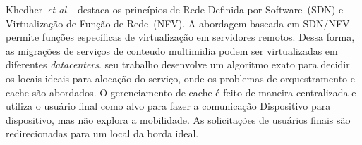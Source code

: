 Khedher~\textit{et al.}~\cite{khedherComNet2017, khedherLCN2017} destaca os princípios de Rede Definida por Software~(SDN) e Virtualização de Função de Rede~(NFV). A abordagem baseada em SDN/NFV permite funções específicas de virtualização em servidores remotos. Dessa forma, as migrações de serviços de conteudo multimidia podem ser virtualizadas em diferentes \textit{datacenters}. seu trabalho desenvolve um algoritmo exato para decidir os locais ideais para alocação do serviço, onde os problemas de orquestramento e cache são abordados. 
O gerenciamento de cache é feito de maneira centralizada e utiliza o usuário final como alvo para fazer a comunicação Dispositivo para dispositivo, mas não explora a mobilidade. As solicitações de usuários finais são redirecionadas para um local da borda ideal.%



